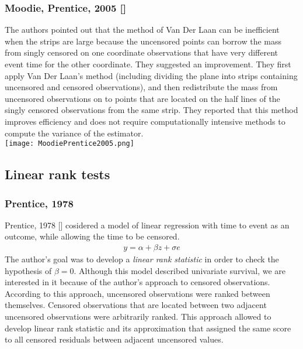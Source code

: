 \documentclass[]{article}
\begin{document}
\subsubsection{Moodie, Prentice, 2005 [\cite{moodie2005adjustment}]}
The authors pointed out that the method of Van Der Laan can be inefficient when the strips are large because the uncensored points can borrow the mass from singly censored on one coordinate observations that have very different event time for the other coordinate. They suggested an improvement. They first apply Van Der Laan's method (including dividing the plane into strips containing uncensored and censored observations), and then redistribute the mass from uncensored observations on to points that are located on the half lines of the singly censored observations from the same strip. They reported that this method improves efficiency and does not require computationally intensive methods to compute the variance of the estimator.\\

\texttt{[image: MoodiePrentice2005.png]}




\subsection{Linear rank tests}

\subsubsection{Prentice, 1978}
Prentice, 1978 [\cite{prentice1978linear}] cosidered a model of linear regression with time to event as an outcome, while allowing the time to be censored.
	$$
	\begin{aligned}
		y = \alpha + \beta z + \sigma e
	\end{aligned}
	$$
The author's goal was to develop a \emph{linear rank statistic} in order to check the hypothesis of $\beta = 0$. Although this model described univariate survival, we are interested in it because of the author's approach to censored observations. 
According to this approach, uncensored observations were ranked between themselves. Censored observations that are located between two adjacent uncensored observations were arbitrarily ranked. This approach allowed to develop linear rank statistic and its approximation that assigned the same score to all censored residuals between adjacent uncensored values.
\end{document}

